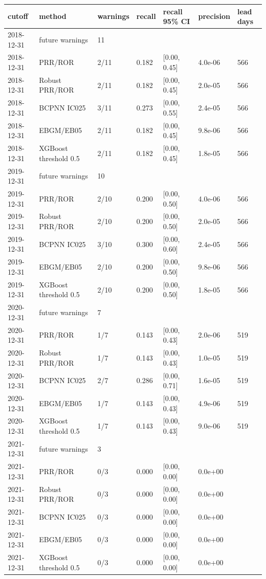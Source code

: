 \begin{tabular}{lllllll}
\toprule
cutoff & method & warnings & recall & recall 95\% CI & precision & lead days \\
\midrule
2018-12-31 & future warnings & 11 &  &  &  &  \\
2018-12-31 & PRR/ROR & 2/11 & 0.182 & [0.00, 0.45] & 4.0e-06 & 566 \\
2018-12-31 & Robust PRR/ROR & 2/11 & 0.182 & [0.00, 0.45] & 2.0e-05 & 566 \\
2018-12-31 & BCPNN IC025 & 3/11 & 0.273 & [0.00, 0.55] & 2.4e-05 & 566 \\
2018-12-31 & EBGM/EB05 & 2/11 & 0.182 & [0.00, 0.45] & 9.8e-06 & 566 \\
2018-12-31 & XGBoost threshold 0.5 & 2/11 & 0.182 & [0.00, 0.45] & 1.8e-05 & 566 \\
2019-12-31 & future warnings & 10 &  &  &  &  \\
2019-12-31 & PRR/ROR & 2/10 & 0.200 & [0.00, 0.50] & 4.0e-06 & 566 \\
2019-12-31 & Robust PRR/ROR & 2/10 & 0.200 & [0.00, 0.50] & 2.0e-05 & 566 \\
2019-12-31 & BCPNN IC025 & 3/10 & 0.300 & [0.00, 0.60] & 2.4e-05 & 566 \\
2019-12-31 & EBGM/EB05 & 2/10 & 0.200 & [0.00, 0.50] & 9.8e-06 & 566 \\
2019-12-31 & XGBoost threshold 0.5 & 2/10 & 0.200 & [0.00, 0.50] & 1.8e-05 & 566 \\
2020-12-31 & future warnings & 7 &  &  &  &  \\
2020-12-31 & PRR/ROR & 1/7 & 0.143 & [0.00, 0.43] & 2.0e-06 & 519 \\
2020-12-31 & Robust PRR/ROR & 1/7 & 0.143 & [0.00, 0.43] & 1.0e-05 & 519 \\
2020-12-31 & BCPNN IC025 & 2/7 & 0.286 & [0.00, 0.71] & 1.6e-05 & 519 \\
2020-12-31 & EBGM/EB05 & 1/7 & 0.143 & [0.00, 0.43] & 4.9e-06 & 519 \\
2020-12-31 & XGBoost threshold 0.5 & 1/7 & 0.143 & [0.00, 0.43] & 9.0e-06 & 519 \\
2021-12-31 & future warnings & 3 &  &  &  &  \\
2021-12-31 & PRR/ROR & 0/3 & 0.000 & [0.00, 0.00] & 0.0e+00 &  \\
2021-12-31 & Robust PRR/ROR & 0/3 & 0.000 & [0.00, 0.00] & 0.0e+00 &  \\
2021-12-31 & BCPNN IC025 & 0/3 & 0.000 & [0.00, 0.00] & 0.0e+00 &  \\
2021-12-31 & EBGM/EB05 & 0/3 & 0.000 & [0.00, 0.00] & 0.0e+00 &  \\
2021-12-31 & XGBoost threshold 0.5 & 0/3 & 0.000 & [0.00, 0.00] & 0.0e+00 &  \\
\bottomrule
\end{tabular}
